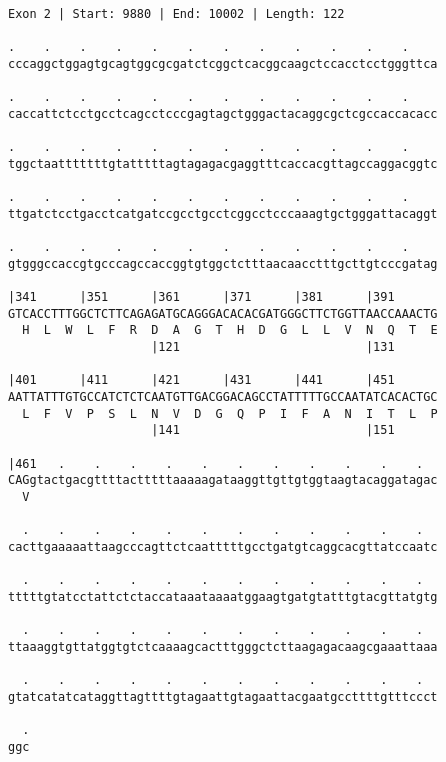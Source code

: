 \documentclass{article}
\begin{document}
\begin{Verbatim}
Exon 2 | Start: 9880 | End: 10002 | Length: 122
 
.    .    .    .    .    .    .    .    .    .    .    .    
cccaggctggagtgcagtggcgcgatctcggctcacggcaagctccacctcctgggttca
  
.    .    .    .    .    .    .    .    .    .    .    .    
caccattctcctgcctcagcctcccgagtagctgggactacaggcgctcgccaccacacc
  
.    .    .    .    .    .    .    .    .    .    .    .    
tggctaatttttttgtatttttagtagagacgaggtttcaccacgttagccaggacggtc
  
.    .    .    .    .    .    .    .    .    .    .    .    
ttgatctcctgacctcatgatccgcctgcctcggcctcccaaagtgctgggattacaggt
  
.    .    .    .    .    .    .    .    .    .    .    .    
gtgggccaccgtgcccagccaccggtgtggctctttaacaacctttgcttgtcccgatag
  
|341      |351      |361      |371      |381      |391      
GTCACCTTTGGCTCTTCAGAGATGCAGGGACACACGATGGGCTTCTGGTTAACCAAACTG
  H  L  W  L  F  R  D  A  G  T  H  D  G  L  L  V  N  Q  T  E
                    |121                          |131      
  
|401      |411      |421      |431      |441      |451      
AATTATTTGTGCCATCTCTCAATGTTGACGGACAGCCTATTTTTGCCAATATCACACTGC
  L  F  V  P  S  L  N  V  D  G  Q  P  I  F  A  N  I  T  L  P
                    |141                          |151      
  
|461   .    .    .    .    .    .    .    .    .    .    .  
CAGgtactgacgttttactttttaaaaagataaggttgttgtggtaagtacaggatagac
  V                                                         
  
  .    .    .    .    .    .    .    .    .    .    .    .  
cacttgaaaaattaagcccagttctcaatttttgcctgatgtcaggcacgttatccaatc
  
  .    .    .    .    .    .    .    .    .    .    .    .  
tttttgtatcctattctctaccataaataaaatggaagtgatgtatttgtacgttatgtg
  
  .    .    .    .    .    .    .    .    .    .    .    .  
ttaaaggtgttatggtgtctcaaaagcactttgggctcttaagagacaagcgaaattaaa
  
  .    .    .    .    .    .    .    .    .    .    .    .  
gtatcatatcataggttagttttgtagaattgtagaattacgaatgccttttgtttccct
  
  .
ggc
\end{Verbatim}
\newpage
\end{document}
